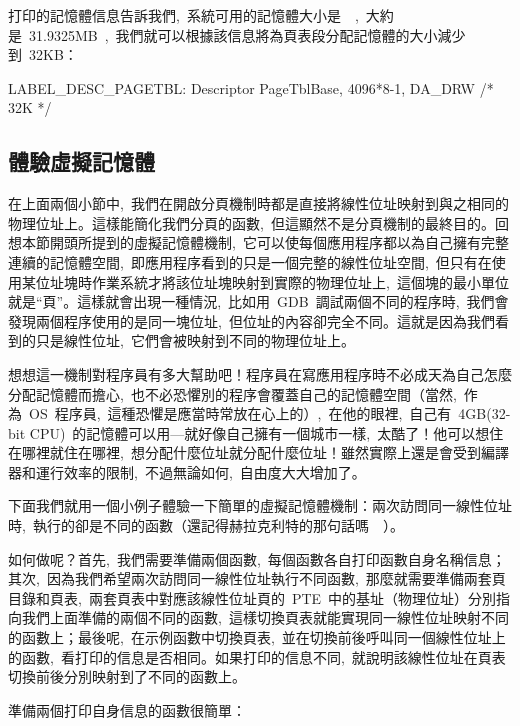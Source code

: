 
打印的記憶體信息告訴我們,~系統可用的記憶體大小是~~,~大約是~31.9325MB~,~我們就可以根據該信息將為頁表段分配記憶體的大小減少到~32KB：

\begin{Command}
LABEL_DESC_PAGETBL: Descriptor PageTblBase,        4096*8-1, DA_DRW /* 32K */
\end{Command}

\subsection{體驗虛擬記憶體}

在上面兩個小節中,~我們在開啟分頁機制時都是直接將線性位址映射到與之相同的物理位址上。這樣能簡化我們分頁的函數,~但這顯然不是分頁機制的最終目的。回想本節開頭所提到的虛擬記憶體機制,~它可以使每個應用程序都以為自己擁有完整連續的記憶體空間,~即應用程序看到的只是一個完整的線性位址空間,~但只有在使用某位址塊時作業系統才將該位址塊映射到實際的物理位址上,~這個塊的最小單位就是“頁”。這樣就會出現一種情況,~比如用~GDB~調試兩個不同的程序時,~我們會發現兩個程序使用的是同一塊位址,~但位址的內容卻完全不同。這就是因為我們看到的只是線性位址,~它們會被映射到不同的物理位址上。

想想這一機制對程序員有多大幫助吧！程序員在寫應用程序時不必成天為自己怎麼分配記憶體而擔心,~也不必恐懼別的程序會覆蓋自己的記憶體空間（當然,~作為~OS~程序員,~這種恐懼是應當時常放在心上的）,~在他的眼裡,~自己有~4GB(32-bit CPU)~的記憶體可以用---就好像自己擁有一個城市一樣,~太酷了！他可以想住在哪裡就住在哪裡,~想分配什麼位址就分配什麼位址！雖然實際上還是會受到編譯器和運行效率的限制,~不過無論如何,~自由度大大增加了。

下面我們就用一個小例子體驗一下簡單的虛擬記憶體機制：兩次訪問同一線性位址時,~執行的卻是不同的函數（還記得赫拉克利特的那句話嗎~\smiley~）。

如何做呢？首先,~我們需要準備兩個函數,~每個函數各自打印函數自身名稱信息；其次,~因為我們希望兩次訪問同一線性位址執行不同函數,~那麼就需要準備兩套頁目錄和頁表,~兩套頁表中對應該線性位址頁的~PTE~中的基址（物理位址）分別指向我們上面準備的兩個不同的函數,~這樣切換頁表就能實現同一線性位址映射不同的函數上；最後呢,~在示例函數中切換頁表,~並在切換前後呼叫同一個線性位址上的函數,~看打印的信息是否相同。如果打印的信息不同,~就說明該線性位址在頁表切換前後分別映射到了不同的函數上。

準備兩個打印自身信息的函數很簡單：


